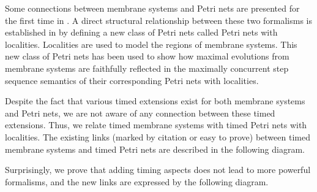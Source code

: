 \documentclass{eptcs}
\begin{document}
Some connections between membrane systems and Petri nets are presented for the
first time in \cite{Zilio04,Qi04}. A direct structural relationship between
these two formalisms is established in \cite{Kleijn10,Kleijn06} by defining a
new class of Petri nets called Petri nets with localities. Localities are used
to model the regions of membrane systems. This new class of Petri
nets has been used to show how maximal evolutions from membrane systems are
faithfully reflected in the maximally concurrent step sequence semantics of
their corresponding Petri nets with localities.

Despite the fact that various timed extensions exist for both
membrane systems and Petri nets, we are not aware of any connection
between these timed extensions. Thus, we relate timed membrane
systems with timed Petri nets with localities. The existing links
(marked by citation or easy to prove) between timed membrane systems
and timed Petri nets are described in the following diagram.

\medskip

\begin{center}
\end{center}

\medskip

\noindent Surprisingly, we prove that adding timing aspects does
not lead to more powerful formalisms, and the new links are expressed
by the following diagram.

\medskip
\end{document}
